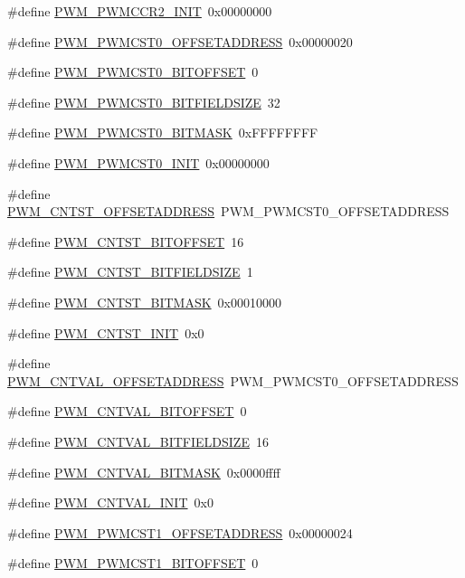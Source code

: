 \begin{DoxyCompactItemize}
\item 
\#define \hyperlink{a00565_a59f99ef8ebff5154854c39b9337ff48b}{PWM\_\-PWMCCR2\_\-INIT}~0x00000000
\item 
\#define \hyperlink{a00565_a5d19a1896da50e99e3f4ffbfa6e78b9a}{PWM\_\-PWMCST0\_\-OFFSETADDRESS}~0x00000020
\item 
\#define \hyperlink{a00565_ad1c39509570f96dc4f7e1c529729ba68}{PWM\_\-PWMCST0\_\-BITOFFSET}~0
\item 
\#define \hyperlink{a00565_ac70a5c6184a303acb66c6d44fb1c2e29}{PWM\_\-PWMCST0\_\-BITFIELDSIZE}~32
\item 
\#define \hyperlink{a00565_ae56f42c138da4a129af7e601a4081b66}{PWM\_\-PWMCST0\_\-BITMASK}~0xFFFFFFFF
\item 
\#define \hyperlink{a00565_a13e2ee4a3d5e3b5343e2888eafd63c35}{PWM\_\-PWMCST0\_\-INIT}~0x00000000
\item 
\#define \hyperlink{a00565_ad80d9a60b1af1c534b6ab06c75d249ec}{PWM\_\-CNTST\_\-OFFSETADDRESS}~PWM\_\-PWMCST0\_\-OFFSETADDRESS
\item 
\#define \hyperlink{a00565_ac937f242c18bb3a56b38d9a764db2d78}{PWM\_\-CNTST\_\-BITOFFSET}~16
\item 
\#define \hyperlink{a00565_a3b6674b72140ed31c824c747122cb5cb}{PWM\_\-CNTST\_\-BITFIELDSIZE}~1
\item 
\#define \hyperlink{a00565_a60cef3d409c8d64931e03cf348cbe8be}{PWM\_\-CNTST\_\-BITMASK}~0x00010000
\item 
\#define \hyperlink{a00565_a02fbeff375a01d36f329a146d4690ad4}{PWM\_\-CNTST\_\-INIT}~0x0
\item 
\#define \hyperlink{a00565_a113821db24adeb5e54b06e9f6dc8bdf7}{PWM\_\-CNTVAL\_\-OFFSETADDRESS}~PWM\_\-PWMCST0\_\-OFFSETADDRESS
\item 
\#define \hyperlink{a00565_af0a974ea0c7d36049043f7b761ad99a5}{PWM\_\-CNTVAL\_\-BITOFFSET}~0
\item 
\#define \hyperlink{a00565_a847c142d9f4ac4ec3fcd415aa67a3483}{PWM\_\-CNTVAL\_\-BITFIELDSIZE}~16
\item 
\#define \hyperlink{a00565_af1714292b4b38e420ed93f69439e1a2c}{PWM\_\-CNTVAL\_\-BITMASK}~0x0000ffff
\item 
\#define \hyperlink{a00565_a47135f22788ad7987b7a45e9905f4495}{PWM\_\-CNTVAL\_\-INIT}~0x0
\item 
\#define \hyperlink{a00565_a34f4aa6de9713fc2060a47ae9bbbf0fd}{PWM\_\-PWMCST1\_\-OFFSETADDRESS}~0x00000024
\item 
\#define \hyperlink{a00565_adeb11942c3e819f9b566e0184e421124}{PWM\_\-PWMCST1\_\-BITOFFSET}~0

\end{DoxyCompactItemize}
